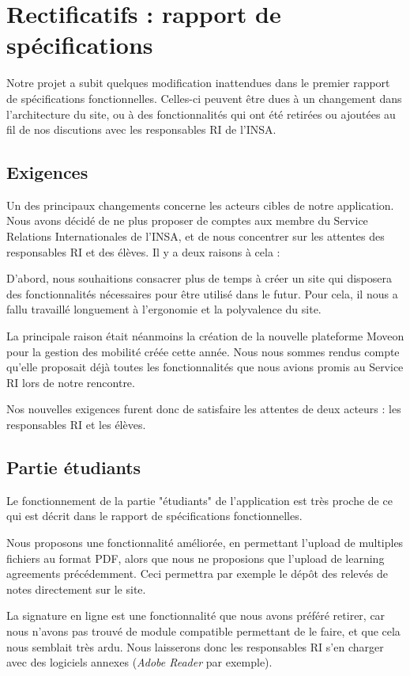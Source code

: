 \chapter{Rectificatifs : rapport de spécifications}
Notre projet a subit quelques modification inattendues dans le premier rapport de spécifications fonctionnelles.  Celles-ci peuvent être dues à un changement dans l'architecture du site, ou à des fonctionnalités qui ont été retirées ou ajoutées au fil de nos discutions avec les responsables RI de l'INSA.

\section{Exigences}
Un des principaux changements concerne les acteurs cibles de notre application. Nous avons décidé de ne plus proposer de comptes aux membre du Service Relations Internationales de l'INSA, et de nous concentrer sur les attentes des responsables RI et des élèves. Il y a deux raisons à cela :

D'abord, nous souhaitions consacrer plus de temps à créer un site qui disposera des fonctionnalités nécessaires pour être utilisé dans le futur. Pour cela, il nous a fallu travaillé longuement à l'ergonomie et la polyvalence du site.

La principale raison était néanmoins la création de la nouvelle plateforme Moveon pour la gestion des mobilité créée cette année. Nous nous sommes rendus compte qu'elle proposait déjà toutes les fonctionnalités que nous avions promis au Service RI lors de notre rencontre.

Nos nouvelles exigences furent donc de satisfaire les attentes de deux acteurs : les responsables RI et les élèves.
\section{Partie étudiants}
Le fonctionnement de la partie "étudiants" de l'application est très proche de ce qui est décrit dans le rapport de spécifications fonctionnelles.

 Nous proposons une fonctionnalité améliorée, en permettant l'upload de multiples fichiers au format PDF, alors que nous ne proposions que l'upload de learning agreements précédemment. Ceci permettra par exemple le dépôt des relevés de notes directement sur le site.

La signature en ligne est une fonctionnalité que nous avons préféré retirer, car nous n'avons pas trouvé de module compatible permettant de le faire, et que cela nous semblait très ardu. Nous laisserons donc les responsables RI s'en charger avec des logiciels annexes (\textit{Adobe Reader} par exemple).
\smallbreak

